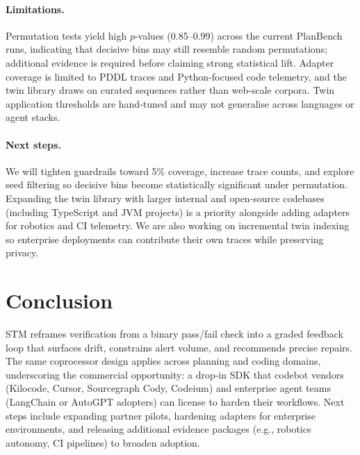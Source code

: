 \documentclass[11pt]{article}
\begin{document}
\paragraph{Limitations.} Permutation tests yield high $p$-values (0.85--0.99) across the current PlanBench runs, indicating that decisive bins may still resemble random permutations; additional evidence is required before claiming strong statistical lift. Adapter coverage is limited to PDDL traces and Python-focused code telemetry, and the twin library draws on curated sequences rather than web-scale corpora. Twin application thresholds are hand-tuned and may not generalise across languages or agent stacks.

\paragraph{Next steps.} We will tighten guardrails toward 5\% coverage, increase trace counts, and explore seed filtering so decisive bins become statistically significant under permutation. Expanding the twin library with larger internal and open-source codebases (including TypeScript and JVM projects) is a priority alongside adding adapters for robotics and CI telemetry. We are also working on incremental twin indexing so enterprise deployments can contribute their own traces while preserving privacy.

\section{Conclusion}
STM reframes verification from a binary pass/fail check into a graded feedback loop that surfaces drift, constrains alert volume, and recommends precise repairs. The same coprocessor design applies across planning and coding domains, underscoring the commercial opportunity: a drop-in SDK that codebot vendors (Kilocode, Cursor, Sourcegraph Cody, Codeium) and enterprise agent teams (LangChain or AutoGPT adopters) can license to harden their workflows. Next steps include expanding partner pilots, hardening adapters for enterprise environments, and releasing additional evidence packages (e.g., robotics autonomy, CI pipelines) to broaden adoption.

\newpage
\appendix
\end{document}

